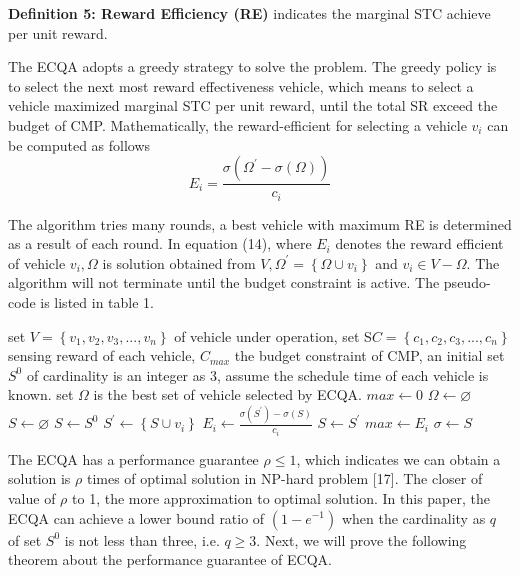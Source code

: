 \documentclass[journal]{IEEEtran}
\begin{document}
\noindent
\textbf{Definition 5: Reward Efficiency (RE)} indicates the marginal STC achieve per unit reward.

The ECQA adopts a greedy strategy to solve the problem. The greedy policy is to select the next most reward effectiveness vehicle, which means to select a vehicle maximized marginal STC per unit reward, until the total SR exceed the budget of CMP. Mathematically, the reward-efficient for selecting a vehicle $v_{i}$ can be computed as follows
\begin{equation}
E_{i}=\frac{\sigma (\Omega ^{'}-\sigma (\Omega))}{c_{i}}
\end{equation}

The algorithm tries many rounds, a best vehicle with maximum RE is determined as a result of each round. In equation (14), where $E_{i}$  denotes the reward efficient of vehicle $v_{i}, \Omega$ is solution obtained from $V, \Omega ^{'}=\left \{ \Omega\cup v_{i}  \right \}$ and $v_{i}\in V-\Omega $. The algorithm will not terminate until the budget constraint is active. The pseudo-code is listed in table 1.

\renewcommand{\algorithmicrequire}{\textbf{Input:}}
\renewcommand{\algorithmicensure}{\textbf{Output:}}
\begin{algorithm}
	\caption{}	
	\begin{algorithmic}
		\Require set $V=\left \{  v_{1},v_{2},v_{3},...,v_{n}\right \}$ of vehicle under operation, set S$C=\left \{  c_{1},c_{2},c_{3},...,c_{n}\right \}$ sensing reward of each vehicle, $C_{max}$ the budget constraint of CMP, an initial set $S^{0}$ of cardinality is an integer as 3, assume the schedule time of each vehicle is known.
		\Ensure set $\Omega $ is the best set of vehicle selected by ECQA. 
		\State $max \gets 0$
		\State $\Omega \gets \varnothing$
		\State $S \gets \varnothing$
			\State $S \gets S^{0}$
				\State $S^{'} \gets \left \{ S\cup v_{i} \right \}$
				\State $E_{i} \gets \frac{\sigma(S^{'})-\sigma (S)}{c_{i}}$
					\State $S \gets S^{'}$
					\State $max \gets E_{i}$
				\EndIf
					\State $ \sigma \gets S$
				\EndIf
			\EndFor		
		\EndFor				
	\end{algorithmic}
\end{algorithm}


The ECQA has a performance guarantee $ \rho \leqslant 1$, which indicates we can obtain a solution is $\rho$ times of optimal solution in NP-hard problem [17]. The closer of value of $\rho$ to 1, the more approximation to optimal solution. In this paper, the ECQA can achieve a lower bound ratio of  $\left (1-e^{-1}  \right )$ when the cardinality as $q$ of set $S^{0}$ is not less than three, i.e. $q\geqslant 3$. Next, we will prove the following theorem about the performance guarantee of ECQA.
\end{document}
